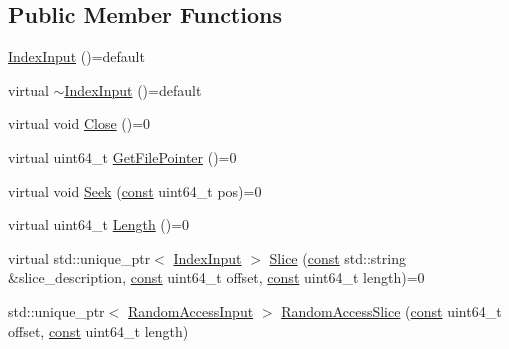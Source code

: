 \subsection*{Public Member Functions}
\begin{DoxyCompactItemize}
\item 
\mbox{\hyperlink{classlucene_1_1core_1_1store_1_1IndexInput_ac7cd221a28f417e0e3d7b3ab610eef01}{Index\+Input}} ()=default
\item 
virtual \mbox{\hyperlink{classlucene_1_1core_1_1store_1_1IndexInput_a89e77b748d1b19504343f45cc270d901}{$\sim$\+Index\+Input}} ()=default
\item 
virtual void \mbox{\hyperlink{classlucene_1_1core_1_1store_1_1IndexInput_a0e33e5c784c5bed48b63b469f5ee6ed6}{Close}} ()=0
\item 
virtual uint64\+\_\+t \mbox{\hyperlink{classlucene_1_1core_1_1store_1_1IndexInput_acd8f7eae5d3518db7e498507c68990af}{Get\+File\+Pointer}} ()=0
\item 
virtual void \mbox{\hyperlink{classlucene_1_1core_1_1store_1_1IndexInput_ad0eecec90fbbcfe46f881d75105a6046}{Seek}} (\mbox{\hyperlink{ZlibCrc32_8h_a2c212835823e3c54a8ab6d95c652660e}{const}} uint64\+\_\+t pos)=0
\item 
virtual uint64\+\_\+t \mbox{\hyperlink{classlucene_1_1core_1_1store_1_1IndexInput_a220f07064bf89579cbb5f8e5aeb3707d}{Length}} ()=0
\item 
virtual std\+::unique\+\_\+ptr$<$ \mbox{\hyperlink{classlucene_1_1core_1_1store_1_1IndexInput}{Index\+Input}} $>$ \mbox{\hyperlink{classlucene_1_1core_1_1store_1_1IndexInput_a3a2d71caf506c20d7c866bdcda5e0171}{Slice}} (\mbox{\hyperlink{ZlibCrc32_8h_a2c212835823e3c54a8ab6d95c652660e}{const}} std\+::string \&slice\+\_\+description, \mbox{\hyperlink{ZlibCrc32_8h_a2c212835823e3c54a8ab6d95c652660e}{const}} uint64\+\_\+t offset, \mbox{\hyperlink{ZlibCrc32_8h_a2c212835823e3c54a8ab6d95c652660e}{const}} uint64\+\_\+t length)=0
\item 
std\+::unique\+\_\+ptr$<$ \mbox{\hyperlink{classlucene_1_1core_1_1store_1_1RandomAccessInput}{Random\+Access\+Input}} $>$ \mbox{\hyperlink{classlucene_1_1core_1_1store_1_1IndexInput_a4d0b2b6f10b0ce57f3bbd82ce8d8a579}{Random\+Access\+Slice}} (\mbox{\hyperlink{ZlibCrc32_8h_a2c212835823e3c54a8ab6d95c652660e}{const}} uint64\+\_\+t offset, \mbox{\hyperlink{ZlibCrc32_8h_a2c212835823e3c54a8ab6d95c652660e}{const}} uint64\+\_\+t length)
\end{DoxyCompactItemize}
